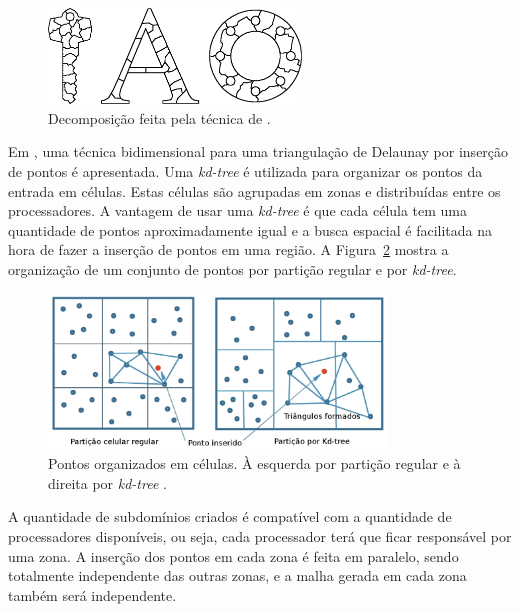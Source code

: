     
    \begin{figure}[htbp]
    	\centering
    	\includegraphics[width=0.6\textwidth]{fig/panitanarak.png}
    	\caption{Decomposição feita pela técnica de \cite{bib:PANITANARAK11}.}
    	\label{fig:panitanarak}
    \end{figure}
    
    
    Em \cite{bib:Lo12}, uma técnica bidimensional para uma triangulação de Delaunay por inserção de pontos é apresentada. Uma \textit{kd-tree} é utilizada para organizar os pontos da entrada em células. Estas células são agrupadas em zonas e distribuídas entre os processadores. A vantagem de usar uma \textit{kd-tree} é que cada célula tem uma quantidade de pontos aproximadamente igual e a busca espacial é facilitada na hora de fazer a inserção de pontos em uma região. A Figura~\ref{fig:lo12_1} mostra a organização de um conjunto de pontos por partição regular e por \textit{kd-tree}.
    
    
    \begin{figure}[htbp]
    	\centering
    	\includegraphics[width=0.8\textwidth]{fig/lo12_1.jpg}
    	\caption{Pontos organizados em células. À esquerda por partição regular e à direita por \textit{kd-tree} \cite{bib:Lo12}.}
    	\label{fig:lo12_1}
    \end{figure} 
    
    
    A quantidade de subdomínios criados é compatível com a quantidade de processadores disponíveis, ou seja, cada processador terá que ficar responsável por uma zona. A inserção dos pontos em cada zona é feita em paralelo, sendo totalmente independente das outras zonas, e a malha gerada em cada zona também será independente.
    

